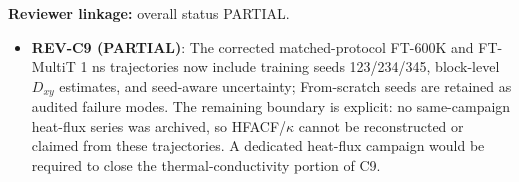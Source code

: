 \textbf{Reviewer linkage:} overall status PARTIAL.
\begin{itemize}[leftmargin=1.4em,noitemsep]
\item \textbf{REV-C9 (PARTIAL)}: The corrected matched-protocol FT-600K and FT-MultiT 1 ns trajectories now include training seeds 123/234/345, block-level $D_{xy}$ estimates, and seed-aware uncertainty; From-scratch seeds are retained as audited failure modes. The remaining boundary is explicit: no same-campaign heat-flux series was archived, so HFACF/$\kappa$ cannot be reconstructed or claimed from these trajectories. A dedicated heat-flux campaign would be required to close the thermal-conductivity portion of C9.
\end{itemize}
